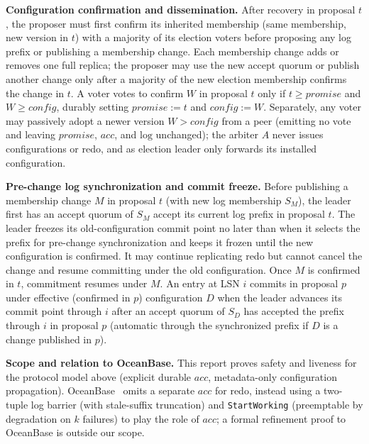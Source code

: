 \documentclass[sigconf,nonacm]{acmart}
\newcommand{\acc}{\mathit{acc}}
\begin{document}
\textbf{Configuration confirmation and dissemination.} After recovery
in proposal \(t\), the proposer must first confirm its inherited
membership (same membership, new version in \(t\)) with a majority of
its election voters before proposing any log prefix or publishing a
membership change. Each membership change adds or removes one full
replica; the proposer may use the new accept quorum or publish another
change only after a majority of the new election membership confirms the
change in \(t\). A voter votes to confirm \(W\) in proposal \(t\) only
if \(t\ge\mathit{promise}\) and \(W\ge\mathit{config}\), durably setting
\(\mathit{promise}:=t\) and \(\mathit{config}:=W\). Separately, any
voter may passively adopt a newer version \(W>\mathit{config}\) from a
peer (emitting no vote and leaving \(\mathit{promise}\), \(\acc\), and
\(\mathrm{log}\) unchanged); the arbiter \(A\) never issues
configurations or redo, and as election leader only forwards its
installed configuration.

\textbf{Pre-change log synchronization and commit freeze.}
Before publishing a membership change \(M\) in proposal \(t\) (with new
log membership \(S_M\)), the leader first has an accept quorum of
\(S_M\) accept its current log prefix in proposal \(t\). The leader
freezes its old-configuration commit point no later than when it selects
the prefix for pre-change synchronization and keeps it frozen until the
new configuration is confirmed. It may continue replicating redo but
cannot cancel the change and resume committing under the old
configuration. Once \(M\) is confirmed in \(t\), commitment resumes
under \(M\). An entry at LSN \(i\) commits in proposal \(p\) under
effective (confirmed in \(p\)) configuration \(D\) when the leader
advances its commit point through \(i\) after an accept quorum of \(S_D\)
has accepted the prefix through \(i\) in proposal \(p\) (automatic
through the synchronized prefix if \(D\) is a change published in
\(p\)).

\textbf{Scope and relation to OceanBase.} This report proves safety and
liveness for the protocol model above (explicit durable \(\acc\),
metadata-only configuration propagation). OceanBase~\cite{arbitration}
omits a separate \(\acc\) for redo, instead using a two-tuple log
barrier (with stale-suffix truncation) and \texttt{StartWorking}
(preemptable by degradation on \(k\) failures) to play the role of
\(\acc\); a formal refinement proof to OceanBase is outside our scope.
\par
\endgroup
\end{document}
